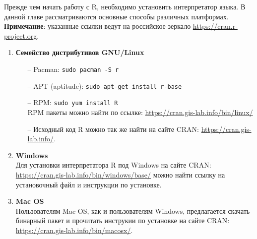     Прежде чем начать работу с R, необходимо установить интерпретатор языка. В данной главе рассматриваются 
    основные способы различных платформах. \textbf{Примечание}: указанные ссылки ведут на 
    российское зеркало \url{https://cran.r-project.org}.
    \begin{enumerate}
        \item \textbf{Семейство дистрибутивов GNU/Linux}
            \begin{itemize}
                \item[--] Pacman: \texttt{sudo pacman -S r}
                \item[--] APT (aptitude):
                    \texttt{sudo apt-get install r-base}
                
                \item[--] RPM:
                    \texttt{sudo yum install R} \\
                    RPM пакеты можно найти по ссылке:
                    \url{https://cran.gis-lab.info/bin/linux/}
                
                \item[--] Исходный код R можно так же найти на сайте CRAN:
                    \url{https://cran.gis-lab.info/}.
            \end{itemize}
        
        \item \textbf{Windows} \\
            Для установки интерпретатора R под Windows на сайте CRAN:
            \url{https://cran.gis-lab.info/bin/windows/base/}
            можно найти ссылку на установочный файл и инструкции по установке.
        
        \item \textbf{Mac OS} \\
            Пользователям Mac OS, как и пользователям Windows, предлагается скачать
            бинарный пакет и прочитать инструкии по установке на сайте CRAN:
            \url{https://cran.gis-lab.info/bin/macosx/}.
    \end{enumerate} 
    
